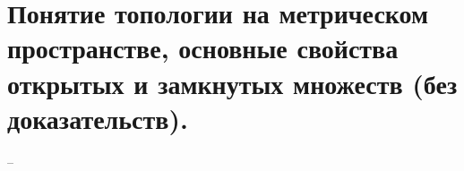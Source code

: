 \section{Понятие топологии на метрическом пространстве, основные свойства открытых и замкнутых множеств (без доказательств).}
--
\newline